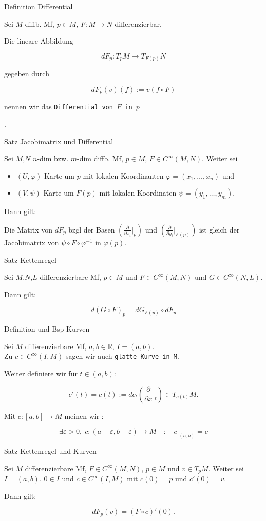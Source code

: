 \documentclass[a6paper,11pt,grid=front]{kartei}
\newcommand{\fl}[1]{\begin{flushleft}
 #1 \end{flushleft}}
\newcommand{\R}{\mathbb{R}}
\newcommand{\eps}{\varepsilon}
\newcounter{def}
\begin{document}

\nonameyet
{Definition} {Differential}
{
Sei $M$ diffb. Mf, $p\in M$, $F : M \to N$ differenzierbar.
\fl{Die lineare Abbildung}
\[
dF_p : T_pM \to T_{F(p)}N 
\] 
\fl{gegeben durch}
\[
dF_p(v)(f) := v(f\circ F)
\]
\fl{nennen wir das \texttt{Differential von $F$ in $p$}}.
}
{}

\nonameyet
{Satz} {\tiny Jacobimatrix und Differential}
{
\small
Sei $M$,$N$ $n$-dim bzw. $m$-dim diffb. Mf, $p\in M$, $F \in C^\infty(M,N)$. 
Weiter sei \begin{itemize}[-]
\item $(U,\varphi)$ Karte um $p$ mit lokalen Koordinanten 
$\varphi = (x_1,\dots,x_n)$ und  
\item $(V,\psi)$ Karte um $F(p)$ mit 
lokalen Koordinaten $\psi = (y_1,\dots,y_m)$.
\end{itemize}
\fl{Dann gilt:}
Die Matrix von $dF_p$ bzgl der Basen 
$(\frac{\partial}{\partial x_i}\big|_{p})$ und 
$(\frac{\partial}{\partial y_i}\big|_{F(p)})$ ist gleich der Jacobimatrix von
$\psi \circ F \circ \varphi^ {-1}$ in $\varphi(p)$.
}
{}

\nonameyet
{Satz} {Kettenregel}
{
Sei $M$,$N$,$L$ differenzierbare Mf, $p\in M$ und $F\in C^\infty(M,N)$ und $G\in C^\infty(N,L)$.
\fl{Dann gilt:}
\[
d(G\circ F)_p = dG_{F(p)}\circ dF_p 
\]
}
{}


\nonameyet
{Definition und Bsp} {Kurven}
{
Sei $M$ differenzierbare Mf, $a,b \in \R$, $I = (a,b)$.
\\
Zu $c\in C^\infty(I, M)$ sagen wir auch \texttt{glatte Kurve in M}.
\fl{Weiter definiere wir für $t\in (a,b)$:}
\[
c'(t) = \dot c(t) := dc_t(\frac{\partial}{\partial x}\bigg|_t)
\in T_{c(t)} M.
\]
\fl{Mit $c: [a,b] \to M$ meinen wir :}
\[
\exists \eps > 0,\; \overline c :(a - \eps, b + \eps) \to M
\quad : \quad  \overline c |_{(a,b)} = c
\]
}
{}

\nonameyet
{Satz} {Kettenregel und Kurven}
{
Sei $M$ differenzierbare Mf, $F\in C^\infty(M,N)$, $p\in M$ und $v\in T_pM$.
Weiter sei $I = (a,b)$, $0\in I$ und $c \in C^\infty(I,M)$ mit $c(0) = p$ 
und $c'(0) = v$.
\fl{Dann gilt:}
\[
dF_p(v) = (F \circ c)' (0).
\]
}
{}
\end{document}
